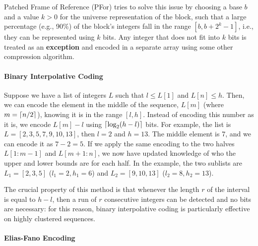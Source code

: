 Patched Frame of Reference (PFor) tries to solve this issue by choosing a base $b$ and a value $k > 0$ for the universe representation of the block, such that a large percentage (e.g., 90\%) of the block's integers fall in the range $[b, b+ 2^k - 1]$, i.e., they can be represented using $k$ bits. Any integer that does not fit into $k$ bits is treated as an \textbf{exception} and encoded in a separate array using some other compression algorithm.

\paragraph{Binary Interpolative Coding}

Suppose we have a list of integers $L$ such that $l \leq L[1]$ and $L[n] \leq h$. Then, we can encode the element in the middle of the sequence, $L[m]$ (where $m = \left\lceil n/2\right\rceil$), knowing it is in the range $[l,h]$. Instead of encoding this number as it is, we encode $L[m] - l$ using $\left\lceil\log_2(h-l)\right\rceil$ bits. For example, the list is $L = [2, 3, 5, 7, 9, 10, 13]$, then $l = 2$ and $h = 13$. The middle element is 7, and we can encode it as $7 - 2 = 5$. If we apply the same encoding to the two halves $L[1:m-1]$ and $L[m+1:n]$, we now have updated knowledge of who the upper and lower bounds are for each half. In the example, the two sublists are $L_1 = [2, 3, 5]$ ($l_1 = 2, h_1 = 6$) and $L_2 = [9, 10, 13]$ ($l_2 = 8, h_2 = 13$).

The crucial property of this method is that whenever the length $r$ of the interval is equal to $h - l$, then a run of $r$ consecutive integers can be detected and no bits are necessary: for this reason, binary interpolative coding is particularly effective on highly clustered sequences.

\paragraph{Elias-Fano Encoding}

